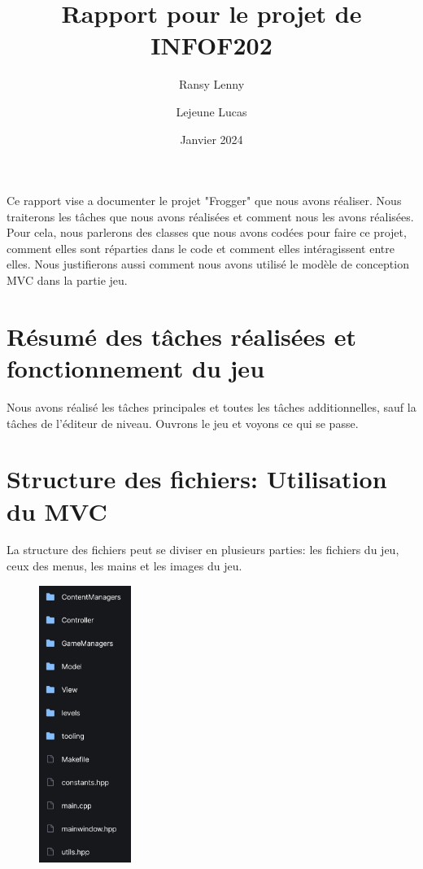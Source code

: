 \documentclass[a4paper, 12pt]{article}
\title{\textbf{Rapport pour le projet de INFOF202}}
\author{
    Ransy Lenny
    \and
    Lejeune Lucas
    }
\date{Janvier 2024}
\begin{document}
\setlength{\parindent}{0em}

\maketitle

Ce rapport vise a documenter le projet "Frogger" que nous avons réaliser. Nous traiterons les tâches que nous avons réalisées et comment nous les avons réalisées. Pour cela, nous parlerons des classes que nous avons codées pour faire ce projet, comment elles sont réparties dans le code et comment elles intéragissent entre elles. Nous justifierons aussi comment nous avons utilisé le modèle de conception MVC dans la partie jeu.

\section{Résumé des tâches réalisées et fonctionnement du jeu}
Nous avons réalisé les tâches principales et toutes les tâches additionnelles, sauf la tâches de l'éditeur de niveau. 
Ouvrons le jeu et voyons ce qui se passe. 

\section{Structure des fichiers: Utilisation du MVC}

La structure des fichiers peut se diviser en plusieurs parties: les fichiers du jeu, ceux des menus, les mains et les images du jeu. \\

\begin{figure}
\includegraphics[width=3cm]{Images/folders.jpg}
\end{figure}
\end{document}
